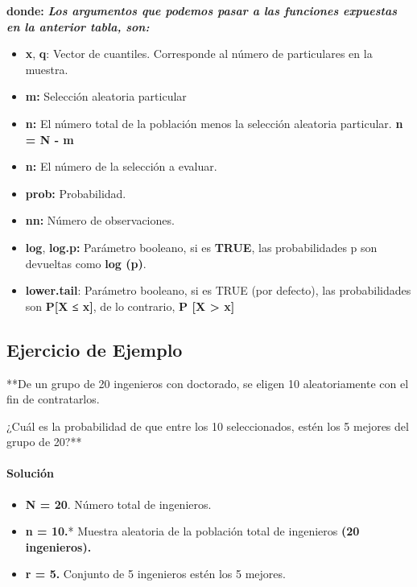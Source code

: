 \documentclass[
]{article}
\providecommand{\tightlist}{%
  \setlength{\itemsep}{0pt}\setlength{\parskip}{0pt}}
\begin{document}
\textbf{donde:} \textbf{\emph{Los argumentos que podemos pasar a las
funciones expuestas en la anterior tabla, son:}}

\begin{itemize}
\item
  \textbf{x}, \textbf{q}: Vector de cuantiles. Corresponde al número de
  particulares en la muestra.
\item
  \textbf{m:} Selección aleatoria particular
\item
  \textbf{n:} El número total de la población menos la selección
  aleatoria particular. \textbf{n = N - m}
\item
  \textbf{n:} El número de la selección a evaluar.
\item
  \textbf{prob:} Probabilidad.
\item
  \textbf{nn:} Número de observaciones.
\item
  \textbf{log}, \textbf{log.p:} Parámetro booleano, si es \textbf{TRUE},
  las probabilidades p son devueltas como \textbf{log (p)}.
\item
  \textbf{lower.tail}: Parámetro booleano, si es TRUE (por defecto), las
  probabilidades son \textbf{P{[}X ≤ x{]}}, de lo contrario, \textbf{P
  {[}X \textgreater{} x{]}}
\end{itemize}

\hypertarget{ejercicio-de-ejemplo}{%
\subsection{Ejercicio de Ejemplo}\label{ejercicio-de-ejemplo}}

**De un grupo de 20 ingenieros con doctorado, se eligen 10
aleatoriamente con el fin de contratarlos.

¿Cuál es la probabilidad de que entre los 10 seleccionados, estén los 5
mejores del grupo de 20?**

\hypertarget{soluciuxf3n}{%
\paragraph{\texorpdfstring{\textbf{Solución}}{Solución}}\label{soluciuxf3n}}

\begin{itemize}
\tightlist
\item
  \textbf{N = 20}. Número total de ingenieros.
\item
  \textbf{n = 10.}* Muestra aleatoria de la población total de
  ingenieros \textbf{(20 ingenieros).}
\item
  \textbf{r = 5.} Conjunto de 5 ingenieros estén los 5 mejores.
\end{itemize}
\end{document}
